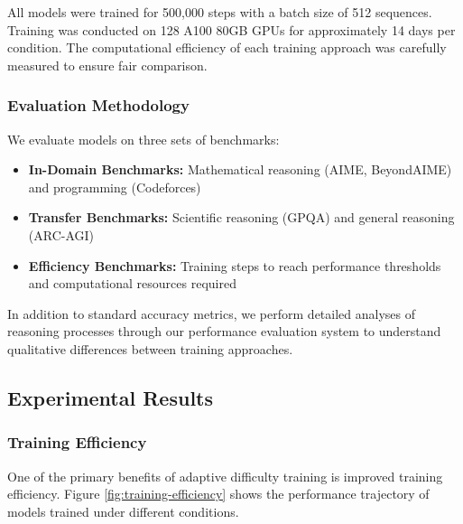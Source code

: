 All models were trained for 500,000 steps with a batch size of 512 sequences. Training was conducted on 128 A100 80GB GPUs for approximately 14 days per condition. The computational efficiency of each training approach was carefully measured to ensure fair comparison.

\subsubsection{Evaluation Methodology}

We evaluate models on three sets of benchmarks:

\begin{itemize}
    \item \textbf{In-Domain Benchmarks:} Mathematical reasoning (AIME, BeyondAIME) and programming (Codeforces)
    \item \textbf{Transfer Benchmarks:} Scientific reasoning (GPQA) and general reasoning (ARC-AGI)
    \item \textbf{Efficiency Benchmarks:} Training steps to reach performance thresholds and computational resources required
\end{itemize}

In addition to standard accuracy metrics, we perform detailed analyses of reasoning processes through our performance evaluation system to understand qualitative differences between training approaches.

\subsection{Experimental Results}

\subsubsection{Training Efficiency}

One of the primary benefits of adaptive difficulty training is improved training efficiency. Figure \ref{fig:training-efficiency} shows the performance trajectory of models trained under different conditions.

